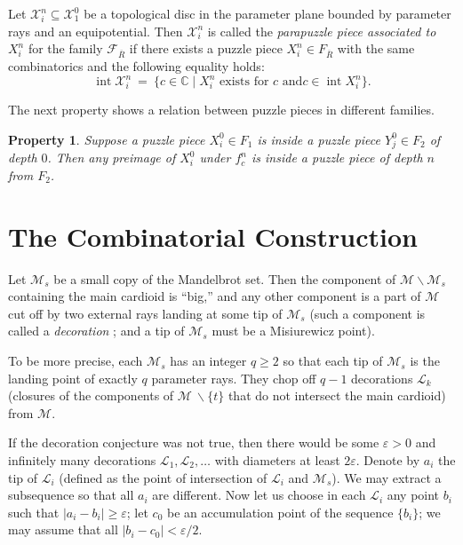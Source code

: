 \documentclass[12pt,a4paper]{amsart}
\newtheorem{property}[theorem]{Property}
\newcommand{\C}{\mathbb{C}}
\newcommand{\LL}{\mathcal L}
\newcommand{\MM}{\mathcal M}
\newcommand{\XX}{\mathcal X}
\newcommand{\eps}{\varepsilon}
\newcommand{\ovl}{\overline}
\newcommand{\intr}{\operatorname{int}}
\begin{document}
Let $\XX^n_i\subseteq \XX^0_1$ be a topological disc
in the parameter plane bounded by parameter rays and an
equipotential. Then $\XX^n_i$ is called the \textit{parapuzzle
piece associated to $X^n_i$} for the family $\mathcal F_{\ovl R}$ if
there exists
a puzzle piece $X^n_i\in F_{\ovl R}$ with the same combinatorics and
the following equality holds:
\begin{equation}
\intr \XX^n_i \ =\ \{c\in\C\mid X^n_i \text{ exists for }c\text{ and
} c\in \intr X^n_i\}.
\end{equation}


The next property shows a relation between puzzle pieces in
different families.

\begin{property}
\label{prop0.2} Suppose a puzzle piece $X^0_i\in F_1$ is inside a
puzzle piece $Y^0_j\in F_2$ of depth $0$. Then any preimage of
$X^0_i$ under $f_c^n$ is inside a puzzle piece of depth $n$ from
$F_2$.

\end{property}

\section{The Combinatorial Construction}
\label{CombinSect}

Let $\MM_{s}$ be a small copy of the Mandelbrot set. Then
the component of $\MM \backslash \MM_{s}$ containing
the main cardioid is ``big,'' and any other component is a part of
$\MM$ cut off by two external rays landing at some tip of
$\MM_{s}$ (such a component is called a \textit{decoration}
\cite{KL}; and a tip of $\MM_{s}$ must be a Misiurewicz
point).

To be more precise, each $\MM_s$ has an integer $q\ge 2$ so that
each tip of $\MM_s$ is the landing point of exactly $q$ parameter
rays. They chop off $q - 1$ decorations $\LL_{k}$ (closures of the
components of $\MM\ \backslash \{t\}$ that do not intersect the main
cardioid) from $\MM$.

If the decoration conjecture was not true, then there
   would be some $\eps>0$ and infinitely many decorations
   $\LL_{1},\LL_{2},\ldots$ with diameters at least
   $2\eps$. Denote by $a_i$ the tip of $\LL_i$ (defined as
the point of intersection of $\LL_i$ and $\MM_s$).
We may extract a subsequence so that all $a_i$ are different.
   Now let us choose in each $\LL_{i}$ any point $b_{i}$
   such that $|a_{i}-b_{i}|\ge \eps$; let $c_{0}$
   be an accumulation point of the sequence $\{b_{i}\}$; we may assume
that all $|b_i-c_0|<\eps/2$.
\end{document}
